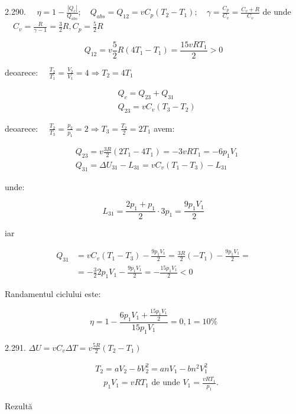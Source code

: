 \documentclass[10pt]{article}
\begin{document}
2.290. $\quad \eta=1-\frac{\left|Q_{c}\right|}{Q_{a b s}} ; \quad Q_{a b s}=Q_{12}=v C_{p}\left(T_{2}-T_{1}\right) ; \quad \gamma=\frac{C_{p}}{C_{v}}=\frac{C_{v}+R}{C_{v}}$ de unde $\quad C_{v}=\frac{R}{\gamma-1}=\frac{3}{2} R, C_{p}=\frac{5}{2} R$

$$
Q_{12}=v \frac{5}{2} R\left(4 T_{1}-T_{1}\right)=\frac{15 v R T_{1}}{2}>0
$$

deoarece: $\quad \frac{T_{2}}{T_{1}}=\frac{V_{2}}{V_{1}}=4 \Rightarrow T_{2}=4 T_{1}$

$$
\begin{aligned}
& Q_{c}=Q_{23}+Q_{31} \\
& Q_{23}=v C_{v}\left(T_{3}-T_{2}\right)
\end{aligned}
$$

deoarece: $\quad \frac{T_{2}}{T_{3}}=\frac{p_{2}}{p_{1}}=2 \Rightarrow T_{3}=\frac{T_{2}}{2}=2 T_{1}$ avem:

$$
\begin{aligned}
& Q_{23}=v \frac{3 R}{2}\left(2 T_{1}-4 T_{1}\right)=-3 v R T_{1}=-6 p_{1} V_{1} \\
& Q_{31}=\Delta U_{31}-L_{31}=v C_{v}\left(T_{1}-T_{3}\right)-L_{31}
\end{aligned}
$$

unde:

$$
L_{31}=\frac{2 p_{1}+p_{1}}{2} \cdot 3 p_{1}=\frac{9 p_{1} V_{1}}{2}
$$

iar

$$
\begin{aligned}
Q_{31} & =v C_{v}\left(T_{1}-T_{3}\right)-\frac{9 p_{1} V_{1}}{2}=\frac{3 R}{2}\left(-T_{1}\right)-\frac{9 p_{1} V_{1}}{2}= \\
& =-\frac{3}{2} 2 p_{1} V_{1}-\frac{9 p_{1} V_{1}}{2}=-\frac{15 p_{1} V_{1}}{2}<0
\end{aligned}
$$

Randamentul ciclului este:

$$
\eta=1-\frac{6 p_{1} V_{1}+\frac{15 p_{1} V_{1}}{2}}{15 p_{1} V_{1}}=0,1=10 \%
$$

2.291. $\Delta U=v C_{v} \Delta T=v \frac{5 R}{2}\left(T_{2}-T_{1}\right)$

$$
\begin{aligned}
& T_{2}=a V_{2}-b V_{2}^{2}=a n V_{1}-b n^{2} V_{1}^{2} \\
& \quad p_{1} V_{1}=v R T_{1} \text { de unde } V_{1}=\frac{v R T_{1}}{p_{1}} .
\end{aligned}
$$

Rezultă
\end{document}
